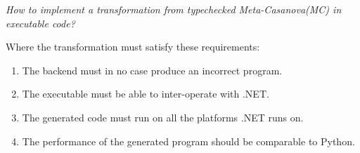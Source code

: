 \textit{How to implement a transformation from typechecked Meta-Casanova(MC) in executable code?}

Where the transformation must satisfy these requirements:
\begin{enumerate}
    \item The backend must in no case produce an incorrect program.
    \item The executable must be able to inter-operate with .NET.
    \item The generated code must run on all the platforms .NET runs on.
    \item The performance of the generated program should be comparable to Python.
\end{enumerate}
